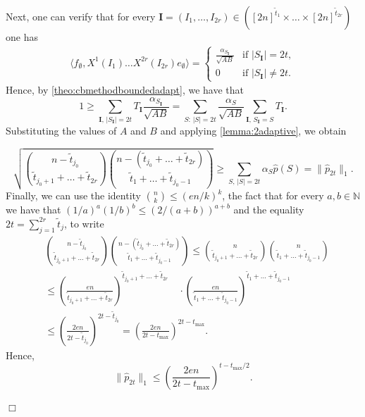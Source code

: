 \documentclass[11pt]{article}
\newcommand{\norm}[1]{\|#1\|}
\newcommand{\N}{\mathbb{N}} %
\newcommand{\1}{\mathbf{1}}
\newcommand{\ind}[1]{\mathbf{#1}}
\theoremstyle{plain}
\theoremstyle{definition}
\theoremstyle{remark}
\renewenvironment{proof}[1][]{
    	\begin{trivlist}
     	\item[\hspace{\labelsep}{\em\noindent Proof#1:\/}]}
     	{{\hfill$\Box$}
    	\end{trivlist}
  }
\begin{document}
\begin{proof}
Next, one can verify that for every $\ind I=(I_1,\dots,I_{2r})\in ([2n]^{\widetilde t_1}\times \dots\times [2n]^{\widetilde t_{2r}})$ one has 
\begin{align*}
\langle f_\emptyset, X^1( I_1)\dots X^{2r}(I_{2r})e_\emptyset\rangle=
\begin{cases}
   \frac{\alpha_{S_\ind I}}{\sqrt{AB}} & \text{if } |S_{\ind I}|=2t,\\
  0  & \text{if } |S_{\ind I}|\neq 2t.
\end{cases}
    \end{align*}
    Hence, by \cref{theo:cbmethodboundedadapt}, we have that 
    \begin{equation*}
        1\geq \sum_{\ind I,\, |S_{\ind I}|=2t}T_{\ind I}\frac{\alpha_{S_\ind I}}{\sqrt{AB}}=\sum_{S:\, |S|=2t}\frac{\alpha_{S}}{\sqrt{AB}}\sum_{\ind I,\, S_{\ind I}=S}T_{\ind I}.
    \end{equation*}
    Substituting the values of $A$ and $B$ and applying \cref{lemma:2adaptive}, we obtain

    \begin{equation*}
        \sqrt{{{n-\widetilde t_{j_0}\choose \widetilde t_{j_0+1}+\dots+\widetilde t_{2r}}{n-(\widetilde t_{j_0}+\dots+\widetilde t_{2r})\choose \widetilde t_1+\dots+\widetilde t_{j_0-1}}
        }}\geq \sum_{S,\, |S|=2t} \alpha_S \widehat p(S)=\norm{\widehat p_{2t}}_1.
    \end{equation*}
    Finally, we can use the identity ${n \choose k}\leq (en/k)^k$, the fact that for every $a,b\in \N$ we have that $(1/a)^{a}(1/b)^{b}\leq (2/(a+b))^{a+b}$ and the equality $2t=\sum_{j=1}^{2r}\tilde{t}_{j}$, to write
    \begin{align*}
        &{{n-\widetilde t_{j_0}\choose \widetilde t_{j_0+1}+\dots+\widetilde t_{2r}}{n-(\widetilde t_{j_0}+\dots+\widetilde t_{2r})\choose \widetilde t_1+\dots+\widetilde t_{j_0-1}}
        }\leq {n\choose \widetilde t_{j_0+1}+\dots+\widetilde t_{2r}}{n\choose \widetilde t_1+\dots+\widetilde t_{j_0-1}}
        \\
        &\leq \left(\frac{en}{\widetilde t_{j_0+1}+\dots+\widetilde t_{2r}}\right)^{\widetilde t_{j_0+1}+\dots+\widetilde t_{2r}}\quad \cdot  \left(\frac{en}{\widetilde t_1+\dots+\widetilde t_{j_0-1}}\right)^{\widetilde t_1+\dots+\widetilde t_{j_0-1}}\\
        &\leq \left(\frac{2en}{2t-\widetilde t_{j_0}}\right)^{2t-\widetilde t_{j_0}}=\left(\frac{2en}{2t-t_{\max}}\right)^{2t-t_{\max}}.
    \end{align*}
    Hence, $$\norm{\widehat p_{2t}}_1\leq \left(\frac{2en}{2t-t_{\max}}\right)^{t-t_{\max}/2}.$$


\end{proof}
\end{document}
